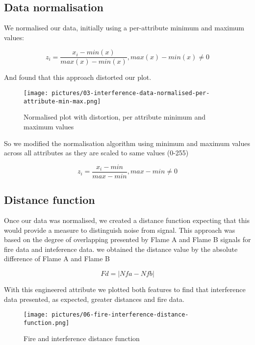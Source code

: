 \subsection{Data normalisation}

We normalised our data, initially using a per-attribute minimum and maximum values:

$$ z{_i}=\frac{x{_i}-min(x)}{max(x)-min(x)} ,max(x)-min(x) \neq 0 $$

And found that this approach distorted our plot.

\begin{figure}[tb]
 \centering %
 \texttt{[image: pictures/03-interference-data-normalised-per-attribute-min-max.png]}
 \caption{Normalised plot with distortion, per attribute minimum and maximum values}
 \label{fig:sample}
\end{figure}

So we modified the normalisation algorithm using minimum and maximum values across all attributes as they are scaled to same values (0-255)

$$ z{_i}=\frac{x{_i}-min}{max-min} , max-min \neq 0 $$

\subsection{Distance function}

Once our data was normalised, we created a distance function expecting that this would provide a measure to distinguish noise from signal. This approach was based on the degree of overlapping presented by Flame A and Flame B signals for fire data and inteference data. we obtained the distance value by the absolute difference of Flame A and Flame B

$$ Fd = |Nfa - Nfb| $$

With this engineered attribute we plotted both features to find that interference data presented, as expected, greater distances and fire data.

\begin{figure}[tb]
 \centering %
 \texttt{[image: pictures/06-fire-interference-distance-function.png]}
 \caption{Fire and interference distance function}
 \label{fig:sample}
\end{figure}

